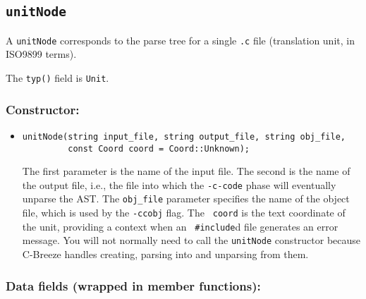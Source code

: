 \documentclass[10pt]{article}
\begin{document}
\subsection{{\tt unitNode}}

A {\tt unitNode} corresponds to the parse tree for a single {\tt .c} file
(translation unit, in ISO9899 terms).

\noindent
The {\tt typ()} field is {\tt Unit}.


\subsubsection*{Constructor:}

\begin{itemize}
\item
\begin{small}
\begin{verbatim}
unitNode(string input_file, string output_file, string obj_file,
         const Coord coord = Coord::Unknown);
\end{verbatim}
\end{small}

The first parameter is the name of the input file.  The second is the name of
the output file, i.e., the file into which the {\tt -c-code} phase will
eventually unparse the AST.  The {\tt obj\_file} parameter specifies the
name of the object file, which is used by the {\tt -ccobj} flag.  The {\tt
coord} is the text coordinate of the unit, providing a context when an {\tt
\#include}d file generates an error message.  You will not normally need to
call the {\tt unitNode} constructor because C-Breeze handles creating,
parsing into and unparsing from them.

\end{itemize}

\subsubsection*{Data fields (wrapped in member functions):}
\end{document}

